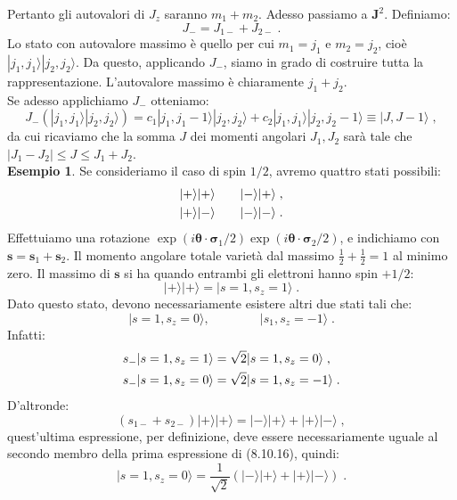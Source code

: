 \documentclass[12pt,a4paper]{report}
\theoremstyle{definition}
\numberwithin{equation}{section}
\newcommand{\ket}{\rangle}
\begin{document}
Pertanto gli autovalori di $J_z$ saranno $m_1+m_2$. Adesso passiamo a $\mathbf{J}^2$. Definiamo:
\begin{equation}
J_-=J_{1-}+J_{2-}\;.
\end{equation}
Lo stato con autovalore massimo è quello per cui $m_1=j_1$ e $m_2=j_2$, cioè $|j_1,j_1\ket|j_2,j_2\ket$. Da questo, applicando $J_-$, siamo in grado di costruire tutta la rappresentazione. L'autovalore massimo è chiaramente $j_1+j_2$. \\
Se adesso applichiamo $J_-$ otteniamo:
\begin{equation}
J_-(|j_1,j_1\ket|j_2,j_2\ket)=c_1|j_1,j_1-1\ket|j_2,j_2\ket+c_2|j_1,j_1\ket|j_2,j_2-1\ket\equiv |J,J-1\ket\;,
\end{equation}
da cui ricaviamo che la somma $J$ dei momenti angolari $J_1,J_2$ sarà tale che $|J_1-J_2|\le J\le J_1+J_2$. \\
\textbf{Esempio 1}. Se consideriamo il caso di spin $1/2$, avremo quattro stati possibili:
\begin{align}
|+\ket|+\ket &\qquad |-\ket|+\ket \notag\;, \\
|+\ket|-\ket &\qquad |-\ket|-\ket\;.
\end{align}
Effettuiamo una rotazione $\exp(i\boldsymbol{\theta}\cdot\boldsymbol{\sigma}_1/2)\exp(i\boldsymbol{\theta}\cdot\boldsymbol{\sigma}_2/2)$, e indichiamo con $\mathbf{s}=\mathbf{s}_1+\mathbf{s}_2$. Il momento angolare totale varietà dal massimo $\frac{1}{2}+\frac{1}{2}=1$ al minimo zero. Il massimo di $\mathbf{s}$ si ha quando entrambi gli elettroni hanno spin $+1/2$:
\begin{equation}
|+\ket|+\ket=|s=1,s_z=1\ket\;.
\end{equation}
Dato questo stato, devono necessariamente esistere altri due stati tali che:
\begin{equation}
|s=1,s_z=0\ket, \qquad \qquad |s_1,s_z=-1\ket\;.
\end{equation}
Infatti:
\begin{align}
s_-|s=1,s_z=1\ket&=\sqrt{2}|s=1,s_z=0\ket\;, \notag \\
s_-|s=1,s_z=0\ket&=\sqrt{2}|s=1,s_z=-1\ket\;.
\end{align}
D'altronde:
\begin{equation}
(s_{1-}+s_{2-})|+\ket|+\ket=|-\ket|+\ket+|+\ket|-\ket\;,
\end{equation}
quest'ultima espressione, per definizione, deve essere necessariamente uguale al secondo membro della prima espressione di (8.10.16), quindi:
\begin{equation}
|s=1,s_z=0\ket =\frac{1}{\sqrt{2}}(|-\ket|+\ket+|+\ket|-\ket)\;.
\end{equation}
\end{document}
